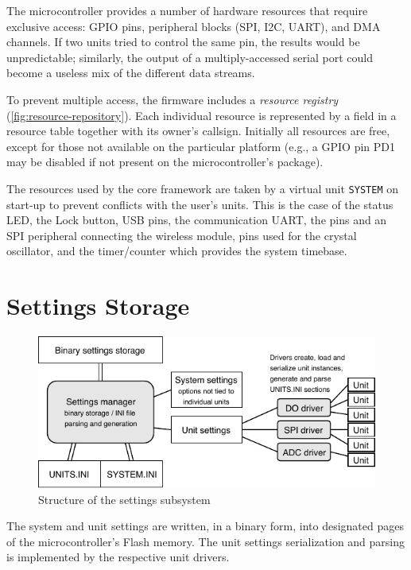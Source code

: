 The microcontroller provides a number of hardware resources that require exclusive access: GPIO pins, peripheral blocks (\gls{SPI}, \gls{I2C}, \gls{UART}\textellipsis), and \gls{DMA} channels. If two units tried to control the same pin, the results would be unpredictable; similarly, the output of a multiply-accessed serial port could become a useless mix of the different data streams.

To prevent multiple access, the firmware includes a \textit{resource registry} (\cref{fig:resource-repository}). Each individual resource is represented by a field in a resource table together with its owner's callsign. Initially all resources are free, except for those not available on the particular platform (e.g., a \gls{GPIO} pin PD1 may be disabled if not present on the microcontroller's package).

The resources used by the core framework are taken by a virtual unit \verb|SYSTEM| on start-up to prevent conflicts with the user's units. This is the case of the status \gls{LED}, the Lock button, \gls{USB} pins, the communication \gls{UART}, the pins and an \gls{SPI} peripheral connecting the wireless module, pins used for the crystal oscillator, and the timer/counter which provides the system timebase.


\section{Settings Storage} \label{sec:settings-storage}

\begin{figure}[h]
	\centering
	\includegraphics[scale=1.2] {img/settings-storage.pdf}
	\caption{\label{fig:settings-storage}Structure of the settings subsystem}
\end{figure}

The system and unit settings are written, in a binary form, into designated pages of the microcontroller's Flash memory. The unit settings serialization and parsing is implemented by the respective unit drivers.

